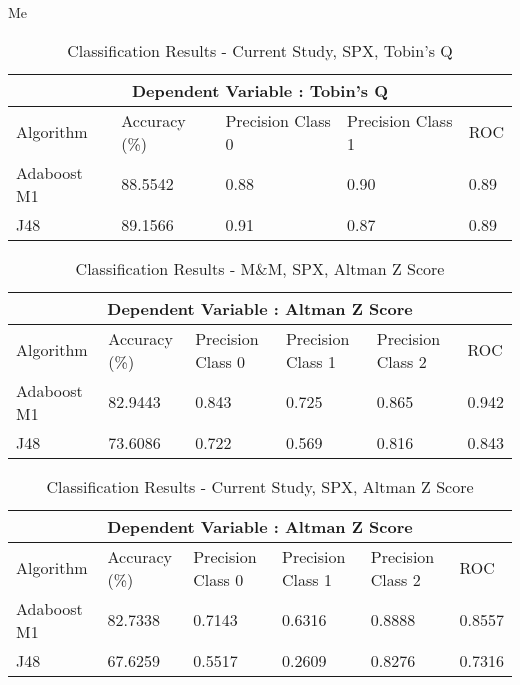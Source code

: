 {Me}
\begin{table}[h!]
\centering
\begin{tabular}{ |p{2.5cm}||p{2.5cm}|p{2.5cm}|p{2.5cm}|p{1.5cm}|  }
 \hline
 \multicolumn{5}{|c|}{Dependent Variable : Tobin's Q} \\
 \hline
 Algorithm & Accuracy (\%) & Precision Class 0 & Precision Class 1 & ROC \\
 \hline
 Adaboost M1  &  88.5542     & 0.88 &  0.90 & 0.89  \\
 J48  & 89.1566  & 0.91 &  0.87 & 0.89  \\
 \hline
\end{tabular}
\caption{Classification Results  - Current Study, SPX, Tobin's Q}
\end{table}
\clearpage


\begin{table}[h]
\begin{tabular}{ |p{2.5cm}||p{2.5cm}|p{2.5cm}|p{2.5cm}|p{2.5cm}|p{1.5cm}|  }
 \hline
 \multicolumn{6}{|c|}{Dependent Variable : Altman Z Score} \\
 \hline
 Algorithm & Accuracy (\%) & Precision Class 0 & Precision Class 1 & Precision Class 2 & ROC \\
 \hline
 Adaboost M1  &  82.9443     & 0.843 &  0.725 & 0.865 & 0.942  \\
 J48  & 73.6086  & 0.722 &  0.569 & 0.816 & 0.843  \\
 \hline
\end{tabular}
\caption{Classification Results  - M\&M, SPX, Altman Z Score}
\end{table}

\begin{table}[h!]
\centering
\begin{tabular}{ |p{2.5cm}||p{2.5cm}|p{2.5cm}|p{2.5cm}|p{2.5cm}|p{1.5cm}|  }
 \hline
 \multicolumn{6}{|c|}{Dependent Variable : Altman Z Score} \\
 \hline
 Algorithm & Accuracy (\%) & Precision Class 0 & Precision Class 1 & Precision Class 2 & ROC \\
 \hline
 Adaboost M1  &  82.7338     & 0.7143 &  0.6316 & 0.8888 & 0.8557  \\
 J48  & 67.6259  & 0.5517 &  0.2609 & 0.8276 & 0.7316  \\
 \hline
\end{tabular}
\caption{Classification Results  - Current Study, SPX, Altman Z Score}
\end{table}


\clearpage
